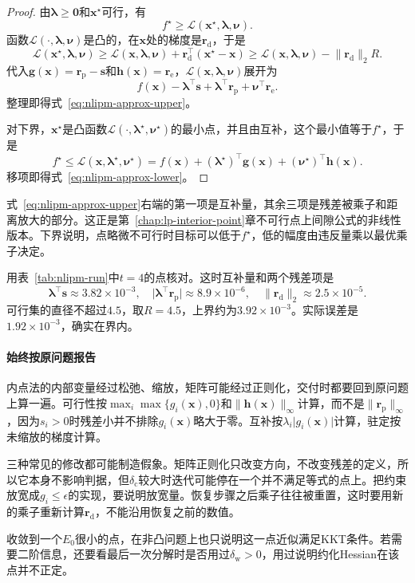 \begin{proof}
由$\bm{\lambda}\geq\bm{0}$和$\bm{x}^\star$可行，有
\[
 f^\star\geq\mathcal{L}(\bm{x}^\star,\bm{\lambda},\bm{\nu}).
\]
函数$\mathcal{L}(\cdot,\bm{\lambda},\bm{\nu})$是凸的，在$\bm{x}$处的梯度是$\bm{r}_{\mathrm{d}}$，于是
\[
 \mathcal{L}(\bm{x}^\star,\bm{\lambda},\bm{\nu})\geq\mathcal{L}(\bm{x},\bm{\lambda},\bm{\nu})+\bm{r}_{\mathrm{d}}^\top(\bm{x}^\star-\bm{x})\geq\mathcal{L}(\bm{x},\bm{\lambda},\bm{\nu})-\lVert\bm{r}_{\mathrm{d}}\rVert_2R.
\]
代入$\bm{g}(\bm{x})=\bm{r}_{\mathrm{p}}-\bm{s}$和$\bm{h}(\bm{x})=\bm{r}_{\mathrm{e}}$，$\mathcal{L}(\bm{x},\bm{\lambda},\bm{\nu})$展开为
\[
 f(\bm{x})-\bm{\lambda}^\top\bm{s}+\bm{\lambda}^\top\bm{r}_{\mathrm{p}}+\bm{\nu}^\top\bm{r}_{\mathrm{e}}.
\]
整理即得式~\eqref{eq:nlipm-approx-upper}。

对下界，$\bm{x}^\star$是凸函数$\mathcal{L}(\cdot,\bm{\lambda}^\star,\bm{\nu}^\star)$的最小点，并且由互补，这个最小值等于$f^\star$，于是
\[
 f^\star\leq\mathcal{L}(\bm{x},\bm{\lambda}^\star,\bm{\nu}^\star)=f(\bm{x})+(\bm{\lambda}^\star)^\top\bm{g}(\bm{x})+(\bm{\nu}^\star)^\top\bm{h}(\bm{x}).
\]
移项即得式~\eqref{eq:nlipm-approx-lower}。
\end{proof}

式~\eqref{eq:nlipm-approx-upper}右端的第一项是互补量，其余三项是残差被乘子和距离放大的部分。这正是第~\ref{chap:lp-interior-point}章不可行点上间隙公式的非线性版本。下界说明，点略微不可行时目标可以低于$f^\star$，低的幅度由违反量乘以最优乘子决定。

用表~\ref{tab:nlipm-run}中$t=4$的点核对。这时互补量和两个残差项是
\[
 \bm{\lambda}^\top\bm{s}\approx3.82\times10^{-3},\quad\lvert\bm{\lambda}^\top\bm{r}_{\mathrm{p}}\rvert\approx8.9\times10^{-6},\quad\lVert\bm{r}_{\mathrm{d}}\rVert_2\approx2.5\times10^{-5}.
\]
可行集的直径不超过$4.5$，取$R=4.5$，上界约为$3.92\times10^{-3}$。实际误差是$1.92\times10^{-3}$，确实在界内。

\paragraph{始终按原问题报告}
内点法的内部变量经过松弛、缩放，矩阵可能经过正则化，交付时都要回到原问题上算一遍。可行性按$\max_i\max\{g_i(\bm{x}),0\}$和$\lVert\bm{h}(\bm{x})\rVert_\infty$计算，而不是$\lVert\bm{r}_{\mathrm{p}}\rVert_\infty$，因为$s_i>0$时残差小并不排除$g_i(\bm{x})$略大于零。互补按$\lambda_i\lvert g_i(\bm{x})\rvert$计算，驻定按未缩放的梯度计算。

三种常见的修改都可能制造假象。矩阵正则化只改变方向，不改变残差的定义，所以它本身不影响判据，但$\delta_{\mathrm{c}}$较大时迭代可能停在一个并不满足等式的点上。把约束放宽成$g_i\leq\epsilon$的实现，要说明放宽量。恢复步骤之后乘子往往被重置，这时要用新的乘子重新计算$\bm{r}_{\mathrm{d}}$，不能沿用恢复之前的数值。

收敛到一个$E_0$很小的点，在非凸问题上也只说明这一点近似满足KKT条件。若需要二阶信息，还要看最后一次分解时是否用过$\delta_{\mathrm{w}}>0$，用过说明约化Hessian在该点并不正定。
